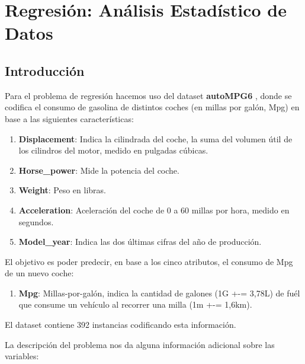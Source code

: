 \section{Regresión: Análisis Estadístico de Datos}

\subsection{Introducción}

Para el problema de regresión hacemos uso del dataset \textbf{autoMPG6} \cite{autompg}, donde se codifica el consumo de gasolina de distintos coches (en millas por galón, Mpg) en base a las siguientes características:

\begin{enumerate}
\def\labelenumi{\arabic{enumi}.}
    \item \textbf{Displacement}: Indica la cilindrada del coche, la suma del volumen útil de los cilindros del motor, medido en pulgadas cúbicas.
    \item \textbf{Horse\_power}: Mide la potencia del coche.
    \item \textbf{Weight}: Peso en libras.
    \item \textbf{Acceleration}: Aceleración del coche de 0 a 60 millas por hora, medido
    en segundos.
    \item \textbf{Model\_year}: Indica las dos últimas cifras del año de producción.
\end{enumerate}

El objetivo es poder predecir, en base a los cinco atributos, el consumo de Mpg de un nuevo coche:

\begin{enumerate}
    \def\labelenumi{\arabic{enumi}.}
    \setcounter{enumi}{5}
    \item \textbf{Mpg}: Millas-por-galón, indica la cantidad de galones (1G +-= 3,78L) de fuél que consume un vehículo al recorrer una milla (1m +-= 1,6km).
\end{enumerate}

El dataset contiene 392 instancias codificando esta información.

La descripción del problema nos da alguna información adicional sobre las variables:

